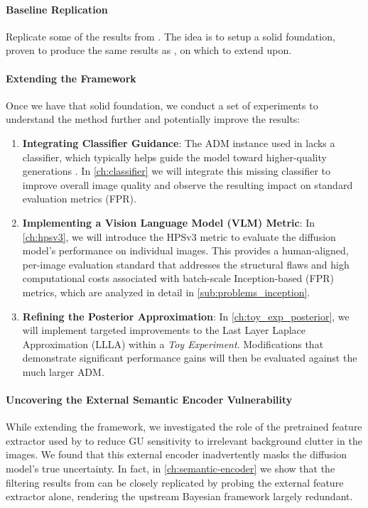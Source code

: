 \paragraph{Baseline Replication} Replicate some of the results from \parencite{jazbec_generative_2025}. The idea is to setup a solid foundation, proven to produce the same results as \parencite{jazbec_generative_2025}, on which to extend upon. 

\paragraph{Extending the Framework} Once we have that solid foundation, we conduct a set of experiments to understand the method further and potentially improve the results:
\begin{enumerate}
    \item \textbf{Integrating Classifier Guidance}: The \acs{ADM} instance used in \cite{jazbec_generative_2025} lacks a classifier, which typically helps guide the model toward higher-quality generations \parencite{dhariwal_diffusion_2021}. In \autoref{ch:classifier} we will integrate this missing classifier to improve overall image quality and observe the resulting impact on standard evaluation metrics (\acs{FPR}).
    \item \textbf{Implementing a Vision Language Model (\acs{VLM}) Metric}: In \autoref{ch:hpsv3}, we will introduce the HPSv3 metric to evaluate the diffusion model's performance on individual images. This provides a human-aligned, per-image evaluation standard that addresses the structural flaws and high computational costs associated with batch-scale Inception-based (\acs{FPR}) metrics, which are analyzed in detail in \autoref{sub:problems_inception}.
    \item \textbf{Refining the Posterior Approximation}: In \autoref{ch:toy_exp_posterior}, we will implement targeted improvements to the Last Layer Laplace Approximation (\acs{LLLA}) within a \textit{Toy Experiment}. Modifications that demonstrate significant performance gains will then be evaluated against the much larger \acs{ADM}.
\end{enumerate}

\paragraph{Uncovering the External Semantic Encoder Vulnerability}
While extending the framework, we investigated the role of the pretrained feature extractor used by \cite{jazbec_generative_2025} to reduce \acs{GU} sensitivity to irrelevant background clutter in the images. We found that this external encoder inadvertently masks the diffusion model's true uncertainty. In fact, in \autoref{ch:semantic-encoder} we show that the filtering results from \cite{jazbec_generative_2025} can be closely replicated by probing the external feature extractor alone, rendering the upstream Bayesian framework largely redundant.

